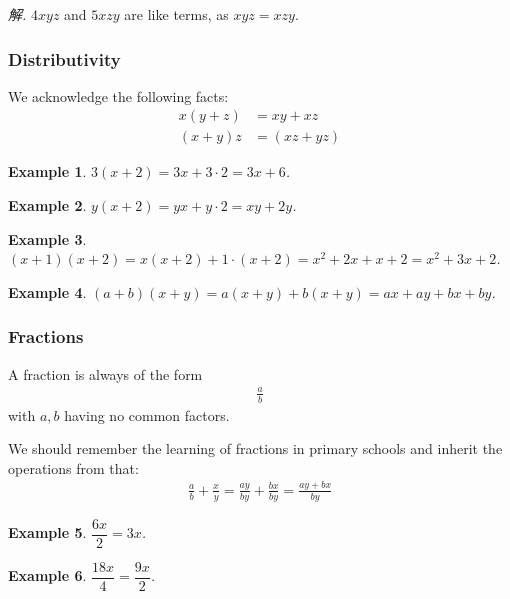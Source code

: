 \documentclass[12pt]{article}
\newtheorem{example}{Example}
\begin{document}
    \textit{ 解.} $4xyz$ and $5xzy$ are like terms, as $xyz=xzy$.

    \subsubsection*{Distributivity}
    We acknowledge the following facts:\begin{align*}
        x(y+z)&=xy+xz\\
        (x+y)z&=(xz+yz)
    \end{align*}

    \begin{example}
        $3(x+2)=3x+3\cdot 2=3x+6$.
    \end{example}
    
    \begin{example}
        $y(x+2)=yx+y\cdot 2=xy+2y$.
    \end{example}
    
    \begin{example}
        $(x+1)(x+2)=x(x+2)+1\cdot (x+2)=x^2+2x+x+2=x^2+3x+2$.
    \end{example}
    
    \begin{example}
        $(a+b)(x+y)=a(x+y)+b(x+y)=ax+ay+bx+by$.
    \end{example}

    \subsubsection*{Fractions}

    A fraction is always of the form \begin{align*}
        \frac{a}{b}
    \end{align*} with $a,b$ having no common factors.

    We should remember the learning of fractions in primary schools and inherit the operations from that:\begin{align*}
        \frac{a}{b}+\frac{x}{y}=\frac{ay}{by}+\frac{bx}{by}=\frac{ay+bx}{by}
    \end{align*}

    \begin{example}
        $\dfrac{6x}{2}=3x$.
    \end{example}

    \begin{example}
        $\dfrac{18x}{4}=\dfrac{9x}{2}$.
    \end{example}
\end{document}
